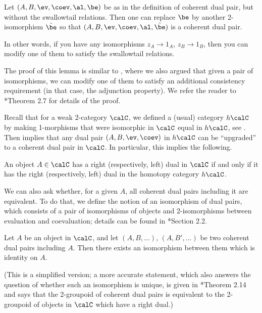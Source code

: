 \begin{lemma}\label{l:dual-pair-upgrade}
  Let $(A, B, \ev, \coev, \al, \be)$ be as in the definition of
  coherent dual pair, but without the swallowtail relations.
  Then one can replace $\be$ by another
  2-isomorphism $\tilde \be$ so that
  $(A, B, \ev, \coev, \al, \tilde \be)$ is a coherent dual pair.
\end{lemma}

In other words, if you have any isomorphisms $z_A\to 1_A$, $z_B\to 1_B$,
then you can modify one of them to satisfy the swallowtail relations.

The proof of this lemma is similar to , where
we also argued that given a pair of isomorphisms, we can modify one of them
to satisfy an additional consistency requirement (in that case, the adjunction
property). We refer the reader to *{Theorem 2.7} for
details of the proof.

Recall that for a weak 2-category $\calC$, we defined a (usual) category
$h\calC$ by making 1-morphisms that were isomorphic in $\calC$ equal in
$h\calC$, see . Then  implies that
any dual pair $(A,B, \ev, \coev)$ in $h\calC$ can be ``upgraded'' to a
coherent dual pair in $\calC$. In particular, this implies the following.

\begin{corollary}\label{c:dual-objects-2cat}
  An object $A\in \calC$ has a right \textup{(}respectively, left\textup{)} dual in $\calC$
  if and only if it has the right \textup{(}respectively, left\textup{)}
  dual in the homotopy category $h\calC$.
\end{corollary}

We can also ask whether, for a given $A$, all coherent dual pairs
including it are equivalent. To do that, we define the notion of
an isomorphism of dual pairs, which consists of a pair of isomorphisms of
objects and 2-isomorphisms between evaluation and coevaluation; details
can be found in *{Section 2.2}.


\begin{theorem}\label{t:coh-dual-pair-unique}
    Let $A$ be an object in $\calC$, and let $(A,B, \dots)$,
    $(A, B', \dots)$ be two coherent dual pairs including $A$.
    Then there exists an isomorphism between them which is identity on $A$.
\end{theorem}

(This is a simplified version; a more accurate statement, which also
answers the question of whether such an isomorphism is unique, is given
in *{Theorem 2.14} and says that the 2-groupoid of
coherent dual pairs is equivalent to the 2-groupoid of
objects in $\calC$ which have a right dual.)

